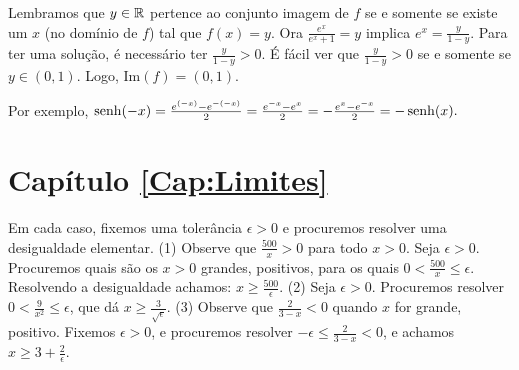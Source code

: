 \begin{Solution}{3.17}
Lembramos que $y\in \mathbb{R}$ pertence ao conjunto imagem de $f$ se e somente
se existe um $x$ (no domínio de $f$) tal que $f(x)=y$.
Ora $\frac{e^{x}}{e^{x}+1}=y$ implica $e^x=\frac{y}{1-y}$. Para ter uma
solução, é necessário ter $\frac{y}{1-y}>0$. É fácil ver que
$\frac{y}{1-y}>0$ se e somente se $y\in (0,1)$. Logo,
$\mathrm{Im}(f)=(0,1)$.
\end{Solution}
\begin{Solution}{3.18}
Por exemplo, $\operatorname{senh} (-x)=\frac{e^{(-x)}-e^{-(-x)}}{2}=\frac{e^{-x}-e^{x}}{2}
=-\frac{e^{x}-e^{-x}}{2}=-\operatorname{senh} (x).$
\end{Solution}
\protect \section *{Capítulo \ref {Cap:Limites}}
\begin{Solution}{4.1}
Em cada caso, fixemos uma tolerância $\epsilon>0$ e procuremos resolver uma
desigualdade elementar.
(1) Observe que $\frac{500}{x}>0$ para todo $x>0$. Seja $\epsilon>0$. Procuremos
quais são os $x>0$ grandes, positivos, para os quais
$0<\frac{500}{x}\leq \epsilon$.
Resolvendo a desigualdade achamos: $x\geq \frac{500}{\epsilon}$.
(2) Seja $\epsilon>0$. Procuremos resolver $0<\frac{9}{x^2}\leq \epsilon$, que dá $x\geq
\frac{3}{\sqrt{\epsilon}}$.
(3) Observe que $\frac{2}{3-x}<0$ quando $x$ for grande, positivo.
Fixemos $\epsilon>0$, e procuremos resolver
$-\epsilon\leq \frac{2}{3-x}<0$, e achamos $x\geq 3+\frac{2}{\epsilon}$.
\end{Solution}
